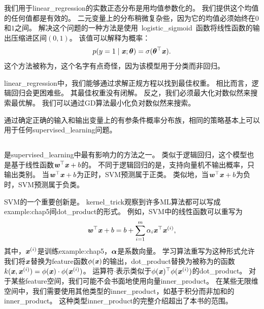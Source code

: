 我们用于\gls{linear_regression}的实数正态分布是用均值参数化的。
我们提供这个均值的任何值都是有效的。
二元变量上的分布稍微复杂些，因为它的均值必须始终在$0$和$1$之间。
解决这个问题的一种方法是使用~\gls{logistic_sigmoid}~函数将线性函数的输出压缩进区间$(0,1)$。
该值可以解释为概率：
\begin{equation}
    p(y = 1 \mid \boldsymbol{\mathit{x}}; \boldsymbol{\theta}) = \sigma(\boldsymbol{\theta}^\top \boldsymbol{\mathit{x}}).
\end{equation}
这个方法被称为，这个名字有点奇怪，因为该模型用于分类而非回归。

\gls{linear_regression}中，我们能够通过求解正规方程以找到最佳权重。
相比而言，逻辑回归会更困难些。
其最佳权重没有闭解。
反之，我们必须最大化对数似然来搜索最优解。
我们可以通过\gls{GD}算法最小化负对数似然来搜索。

通过确定正确的输入和输出变量上的有参条件概率分布族，相同的策略基本上可以用于任何\gls{supervised_learning}问题。

\subsection{}
\label{sec:support_vector_machines}
是\gls{supervised_learning}中最有影响力的方法之一\citep{Boser92,Cortes95}。
类似于逻辑回归，这个模型也是基于线性函数$\boldsymbol{\mathit{w}}^\top \boldsymbol{\mathit{x}} + b$的。
不同于逻辑回归的是，支持向量机不输出概率，只输出类别。
当$\boldsymbol{\mathit{w}}^\top\boldsymbol{\mathit{x}} + b$为正时，\gls{SVM}预测属于正类。
类似地，当$\boldsymbol{\mathit{w}}^\top\boldsymbol{\mathit{x}} + b$为负时，\gls{SVM}预测属于负类。


\gls{SVM}的一个重要创新是。
\gls{kernel_trick}观察到许多\gls{ML}算法都可以写成\gls{example:chap5}间\gls{dot_product}的形式。
例如，\gls{SVM}中的线性函数可以重写为
\begin{equation}
    \boldsymbol{\mathit{w}}^\top \boldsymbol{\mathit{x}} + b = b + \sum_{i=1}^m \alpha_i \boldsymbol{\mathit{x}}^\top \boldsymbol{\mathit{x}}^{(i)} ,
\end{equation}
其中，$\boldsymbol{\mathit{x}}^{(i)}$是训练\gls{example:chap5}，$\boldsymbol{\alpha}$是系数向量。
学习算法重写为这种形式允许我们将$\boldsymbol{\mathit{x}}$替换为\gls{feature}函数$\phi(\boldsymbol{\mathit{x}})$的输出，\gls{dot_product}替换为被称为的函数$k(\boldsymbol{\mathit{x}}, \boldsymbol{\mathit{x}}^{(i)}) = \phi(\boldsymbol{\mathit{x}})\cdot \phi(\boldsymbol{\mathit{x}}^{(i)})$。
运算符$\cdot$表示类似于$\phi(\boldsymbol{\mathit{x}})^\top \phi(\boldsymbol{\mathit{x}}^{(i)})$的\gls{dot_product}。
对于某些\gls{feature}空间，我们可能不会书面地使用向量\gls{inner_product}。
在某些无限维空间中，我们需要使用其他类型的\gls{inner_product}，如基于积分而非加和的\gls{inner_product}。
这种类型\gls{inner_product}的完整介绍超出了本书的范围。

